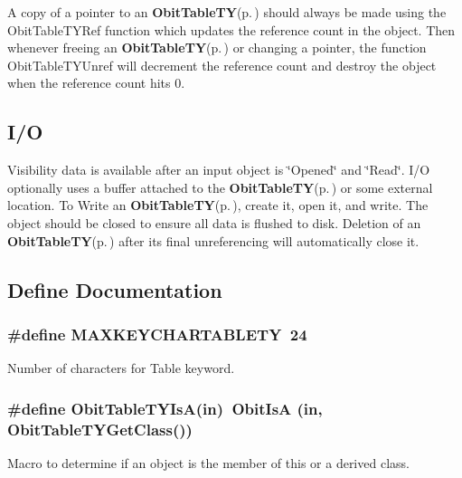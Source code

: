 A copy of a pointer to an {\bf Obit\-Table\-TY}{\rm (p.\,\pageref{structObitTableTY})} should always be made using the Obit\-Table\-TYRef function which updates the reference count in the object. Then whenever freeing an {\bf Obit\-Table\-TY}{\rm (p.\,\pageref{structObitTableTY})} or changing a pointer, the function Obit\-Table\-TYUnref will decrement the reference count and destroy the object when the reference count hits 0.\subsection{I/O}\label{ObitTableTY_8h_ObitTableTYUsage}
Visibility data is available after an input object is \char`\"{}Opened\char`\"{} and \char`\"{}Read\char`\"{}. I/O optionally uses a buffer attached to the {\bf Obit\-Table\-TY}{\rm (p.\,\pageref{structObitTableTY})} or some external location. To Write an {\bf Obit\-Table\-TY}{\rm (p.\,\pageref{structObitTableTY})}, create it, open it, and write. The object should be closed to ensure all data is flushed to disk. Deletion of an {\bf Obit\-Table\-TY}{\rm (p.\,\pageref{structObitTableTY})} after its final unreferencing will automatically close it.

\subsection{Define Documentation}
\subsubsection{\setlength{\rightskip}{0pt plus 5cm}\#define MAXKEYCHARTABLETY\ 24}\label{ObitTableTY_8h_a0}


Number of characters for Table keyword. 

\subsubsection{\setlength{\rightskip}{0pt plus 5cm}\#define Obit\-Table\-TYIs\-A(in)\ Obit\-Is\-A (in, Obit\-Table\-TYGet\-Class())}\label{ObitTableTY_8h_a3}


Macro to determine if an object is the member of this or a derived class. 

